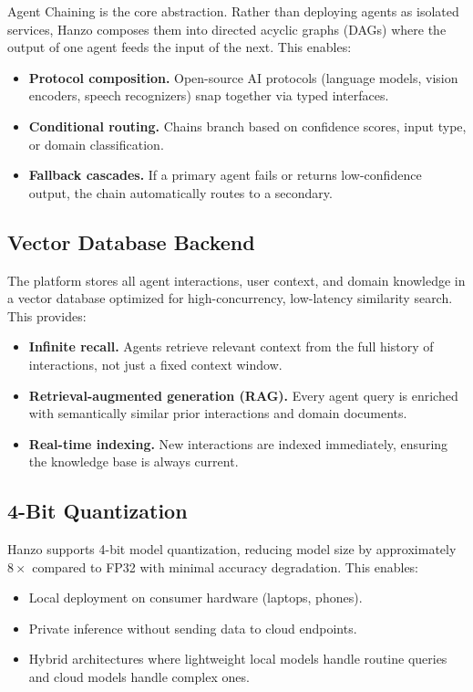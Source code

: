 \documentclass[11pt,twocolumn]{article}
\begin{document}
Agent Chaining is the core abstraction. Rather than deploying agents as isolated
services, Hanzo composes them into directed acyclic graphs (DAGs) where the
output of one agent feeds the input of the next. This enables:

\begin{itemize}[leftmargin=1.1em]
    \item \textbf{Protocol composition.} Open-source AI protocols (language
    models, vision encoders, speech recognizers) snap together via typed
    interfaces.
    \item \textbf{Conditional routing.} Chains branch based on confidence
    scores, input type, or domain classification.
    \item \textbf{Fallback cascades.} If a primary agent fails or returns
    low-confidence output, the chain automatically routes to a secondary.
\end{itemize}

\subsection{Vector Database Backend}

The platform stores all agent interactions, user context, and domain knowledge in
a vector database optimized for high-concurrency, low-latency similarity search.
This provides:

\begin{itemize}[leftmargin=1.1em]
    \item \textbf{Infinite recall.} Agents retrieve relevant context from the
    full history of interactions, not just a fixed context window.
    \item \textbf{Retrieval-augmented generation (RAG).} Every agent query is
    enriched with semantically similar prior interactions and domain documents.
    \item \textbf{Real-time indexing.} New interactions are indexed immediately,
    ensuring the knowledge base is always current.
\end{itemize}

\subsection{4-Bit Quantization}

Hanzo supports 4-bit model quantization, reducing model size by approximately
$8\times$ compared to FP32 with minimal accuracy degradation. This enables:

\begin{itemize}[leftmargin=1.1em]
    \item Local deployment on consumer hardware (laptops, phones).
    \item Private inference without sending data to cloud endpoints.
    \item Hybrid architectures where lightweight local models handle routine
    queries and cloud models handle complex ones.
\end{itemize}
\end{document}
